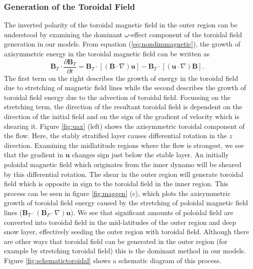\subsubsection{Generation of the Toroidal Field}
The inverted polarity of the toroidal magnetic field in the outer region can be understood by examining the dominant $\omega$-effect component of the toroidal field generation in our models. From equation (\ref{eq:nondimmagnetic}), the growth of axisymmetric energy in the toroidal magnetic field can be written as
\begin{equation}
\mathbf{B}_{T}\cdot\frac{\partial \mathbf{B}_{T}}{\partial t}=\mathbf{B}_{T}\cdot\left[\left(\mathbf{B}\cdot\nabla\right)\mathbf{u}\right]-\mathbf{B}_{T}\cdot\left[\left(\mathbf{u}\cdot\nabla\right)\mathbf{B}\right].
\end{equation}
The first term on the right describes the growth of energy in the toroidal field due to stretching of magnetic field lines while the second describes the growth of toroidal field energy due to the advection of toroidal field. Focussing on the stretching term, the direction of the resultant toroidal field is dependent on the direction of the initial field and on the sign of the gradient of velocity which is shearing it. Figure \ref{fig:uax} (left) shows the axisymmetric toroidal component of the flow. Here, the stably stratified layer causes differential rotation in the $z$ direction. Examining the midlatitude regions where the flow is strongest, we see that the gradient in $\mathbf{u}$ changes sign just below the stable layer. An initially poloidal magnetic field which originates from the inner dynamo will be sheared by this differential rotation. The shear in the outer region will generate toroidal field which is opposite in sign to the toroidal field in the inner region. This process can be seen in figure \ref{fig:maggen} (c), which plots the axisymmetric growth of toroidal field energy caused by the stretching of poloidal magnetic field lines ($\overline{\mathbf{B}_{T}\cdot\left(\mathbf{B}_{P}\cdot\nabla\right)\mathbf{u}}$). We see that significant amounts of poloidal field are converted into toroidal field in the mid-latitudes of the outer region and deep snow layer, effectively seeding the outer region with toroidal field. Although there are other ways that toroidal field can be generated in the outer region (for example by stretching toroidal field) this is the dominant method in our models. Figure \ref{fig:schematictoroidal} shows a schematic diagram of this process.
